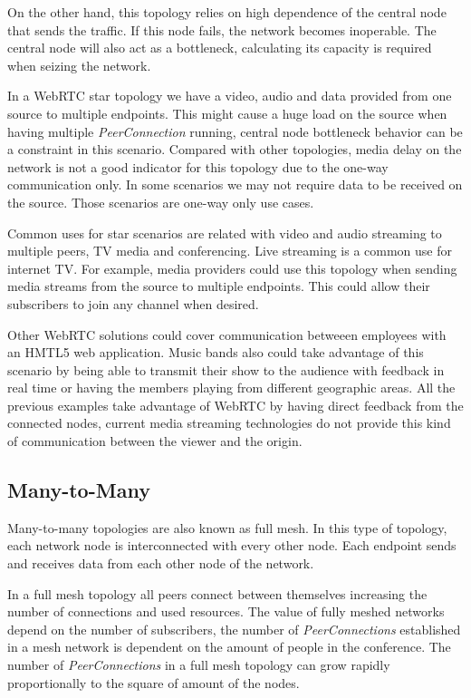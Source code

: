 On the other hand, this topology relies on high dependence of the central node that sends the traffic. If this node fails, the network becomes inoperable. The central node will also act as a bottleneck, calculating its capacity is required when seizing the network.

In a WebRTC star topology we have a video, audio and data provided from one source to multiple endpoints. This might cause a huge load on the source when having multiple {\it PeerConnection} running, central node bottleneck behavior can be a constraint in this scenario. Compared with other topologies, media delay on the network is not a good indicator for this topology due to the one-way communication only. In some scenarios we may not require data to be received on the source. Those scenarios are one-way only use cases.

Common uses for star scenarios are related with video and audio streaming to multiple peers, TV media and conferencing. Live streaming is a common use for internet TV. For example, media providers could use this topology when sending media streams from the source to multiple endpoints. This could allow their subscribers to join any channel when desired. 

Other WebRTC solutions could cover communication betweeen employees with an HMTL5 web application. Music bands also could take advantage of this scenario by being able to transmit their show to the audience with feedback in real time or having the members playing from different geographic areas. All the previous examples take advantage of WebRTC by having direct feedback from the connected nodes, current media streaming technologies do not provide this kind of communication between the viewer and the origin.

\subsection{Many-to-Many}

Many-to-many topologies are also known as full mesh. In this type of topology, each network node is interconnected with every other node. Each endpoint sends and receives data from each other node of the network.

In a full mesh topology all peers connect between themselves increasing the number of connections and used resources. The value of fully meshed networks depend on the number of subscribers, the number of {\it PeerConnections} established in a mesh network is dependent on the amount of people in the conference. The number of {\it PeerConnections} in a full mesh topology can grow rapidly proportionally to the square of amount of the nodes.

